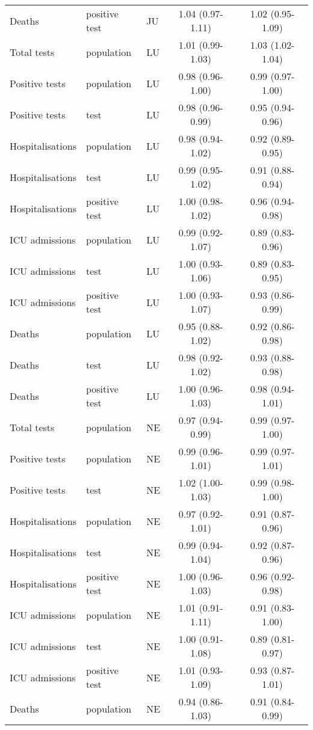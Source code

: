 \documentclass{article}
\begin{document}
\begin{longtable}{lllcc}
		Deaths & positive test & JU & 1.04 (0.97-1.11) & 1.02 (0.95-1.09) \\ 
		Total tests & population & LU & 1.01 (0.99-1.03) & 1.03 (1.02-1.04) \\ 
		Positive tests & population & LU & 0.98 (0.96-1.00) & 0.99 (0.97-1.00) \\ 
		Positive tests & test & LU & 0.98 (0.96-0.99) & 0.95 (0.94-0.96) \\ 
		Hospitalisations & population & LU & 0.98 (0.94-1.02) & 0.92 (0.89-0.95) \\ 
		Hospitalisations & test & LU & 0.99 (0.95-1.02) & 0.91 (0.88-0.94) \\ 
		Hospitalisations & positive test & LU & 1.00 (0.98-1.02) & 0.96 (0.94-0.98) \\ 
		ICU admissions & population & LU & 0.99 (0.92-1.07) & 0.89 (0.83-0.96) \\ 
		ICU admissions & test & LU & 1.00 (0.93-1.06) & 0.89 (0.83-0.95) \\ 
		ICU admissions & positive test & LU & 1.00 (0.93-1.07) & 0.93 (0.86-0.99) \\ 
		Deaths & population & LU & 0.95 (0.88-1.02) & 0.92 (0.86-0.98) \\ 
		Deaths & test & LU & 0.98 (0.92-1.02) & 0.93 (0.88-0.98) \\ 
		Deaths & positive test & LU & 1.00 (0.96-1.03) & 0.98 (0.94-1.01) \\ 
		Total tests & population & NE & 0.97 (0.94-0.99) & 0.99 (0.97-1.00) \\ 
		Positive tests & population & NE & 0.99 (0.96-1.01) & 0.99 (0.97-1.01) \\ 
		Positive tests & test & NE & 1.02 (1.00-1.03) & 0.99 (0.98-1.00) \\ 
		Hospitalisations & population & NE & 0.97 (0.92-1.01) & 0.91 (0.87-0.96) \\ 
		Hospitalisations & test & NE & 0.99 (0.94-1.04) & 0.92 (0.87-0.96) \\ 
		Hospitalisations & positive test & NE & 1.00 (0.96-1.03) & 0.96 (0.92-0.98) \\ 
		ICU admissions & population & NE & 1.01 (0.91-1.11) & 0.91 (0.83-1.00) \\ 
		ICU admissions & test & NE & 1.00 (0.91-1.08) & 0.89 (0.81-0.97) \\ 
		ICU admissions & positive test & NE & 1.01 (0.93-1.09) & 0.93 (0.87-1.01) \\ 
		Deaths & population & NE & 0.94 (0.86-1.03) & 0.91 (0.84-0.99) \\ 

\end{longtable}
\end{document}
